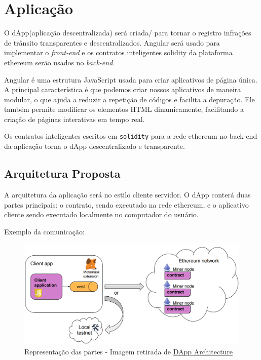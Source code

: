 \section{Aplicação}

O dApp(aplicação descentralizada) será criada/ para tornar o registro infrações de trânsito transparentes e descentralizados. Angular será usado para implementar o \textit{front-end} e os contratos inteligentes solidity da plataforma ethereum serão usados no \textit{back-end}. 

Angular é uma estrutura JavaScript usada para criar aplicativos de página única. A principal característica é que podemos criar nossos aplicativos de maneira modular, o que ajuda a reduzir a repetição de códigos e facilita a depuração. Ele também permite modificar os elementos HTML dinamicamente, facilitando a criação de páginas interativas em tempo real. 

Os contratos inteligentes escritos em \verb|solidity| para a rede ethereum no back-end da aplicação torna o dApp descentralizado e transparente. 

\subsection{Arquitetura Proposta}

A arquitetura da aplicação será no estilo cliente servidor. O dApp conterá duas partes principais: o contrato, sendo executado na rede ethereum, e o aplicativo cliente sendo executado localmente no computador do usuário.

Exemplo da comunicação:

    \begin{figure}[H]
         \centering
         \includegraphics[scale=0.25]{figuras/capitulo_3/dapp_representacao_comunicacao.png}
         \caption{Representação das partes - Imagem retirada de \href{https://sites.google.com/site/blockchaintutorial/dapp-architecture}{DApp Architecture}}
         \label{fig:dapp_representacao}
    \end{figure}



